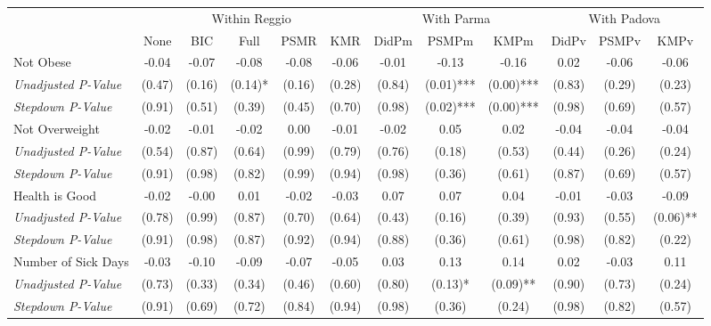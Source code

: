 \begin{tabular}{l c c c c c c c c c c c}
\toprule
& \multicolumn{5}{c}{Within Reggio} & \multicolumn{3}{c}{With Parma} & \multicolumn{3}{c}{With Padova} \\\cmidrule(lr){2-6} \cmidrule(lr){7-9} \cmidrule(lr){10-12}
 & None & BIC & Full & PSMR & KMR & DidPm & PSMPm & KMPm & DidPv & PSMPv & KMPv \\
\midrule
Not Obese & -0.04 & -0.07 & -0.08 & -0.08 & -0.06 & -0.01 & -0.13 & -0.16 & 0.02 & -0.06 & -0.06 \\
\quad \textit{Unadjusted P-Value} & (0.47) & (0.16) & (0.14)* & (0.16) & (0.28) & (0.84) & (0.01)*** & (0.00)*** & (0.83) & (0.29) & (0.23) \\
\quad \textit{Stepdown P-Value} & (0.91) & (0.51) & (0.39) & (0.45) & (0.70) & (0.98) & (0.02)*** & (0.00)*** & (0.98) & (0.69) & (0.57) \\
Not Overweight & -0.02 & -0.01 & -0.02 & 0.00 & -0.01 & -0.02 & 0.05 & 0.02 & -0.04 & -0.04 & -0.04 \\
\quad \textit{Unadjusted P-Value} & (0.54) & (0.87) & (0.64) & (0.99) & (0.79) & (0.76) & (0.18) & (0.53) & (0.44) & (0.26) & (0.24) \\
\quad \textit{Stepdown P-Value} & (0.91) & (0.98) & (0.82) & (0.99) & (0.94) & (0.98) & (0.36) & (0.61) & (0.87) & (0.69) & (0.57) \\
Health is Good & -0.02 & -0.00 & 0.01 & -0.02 & -0.03 & 0.07 & 0.07 & 0.04 & -0.01 & -0.03 & -0.09 \\
\quad \textit{Unadjusted P-Value} & (0.78) & (0.99) & (0.87) & (0.70) & (0.64) & (0.43) & (0.16) & (0.39) & (0.93) & (0.55) & (0.06)** \\
\quad \textit{Stepdown P-Value} & (0.91) & (0.98) & (0.87) & (0.92) & (0.94) & (0.88) & (0.36) & (0.61) & (0.98) & (0.82) & (0.22) \\
Number of Sick Days & -0.03 & -0.10 & -0.09 & -0.07 & -0.05 & 0.03 & 0.13 & 0.14 & 0.02 & -0.03 & 0.11 \\
\quad \textit{Unadjusted P-Value} & (0.73) & (0.33) & (0.34) & (0.46) & (0.60) & (0.80) & (0.13)* & (0.09)** & (0.90) & (0.73) & (0.24) \\
\quad \textit{Stepdown P-Value} & (0.91) & (0.69) & (0.72) & (0.84) & (0.94) & (0.98) & (0.36) & (0.24) & (0.98) & (0.82) & (0.57) \\
\bottomrule
\end{tabular}
